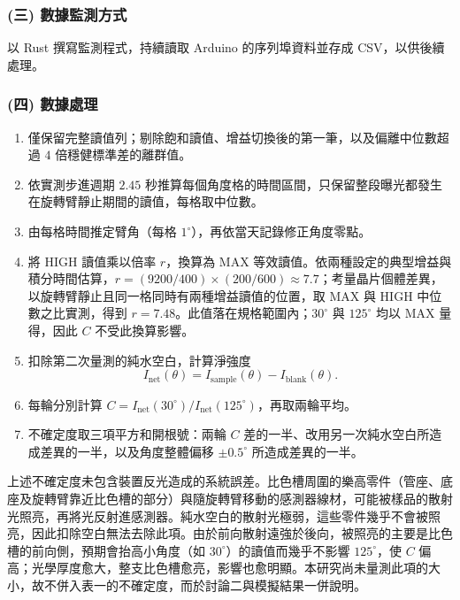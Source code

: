 \subsubsection*{(三) 數據監測方式}
以 Rust 撰寫監測程式，持續讀取 Arduino 的序列埠資料並存成 CSV，以供後續處理。

\subsubsection*{(四) 數據處理}
\begin{enumerate}
    \item 僅保留完整讀值列；剔除飽和讀值、增益切換後的第一筆，以及偏離中位數超過 $4$ 倍穩健標準差的離群值。
    \item 依實測步進週期 $2.45$ 秒推算每個角度格的時間區間，只保留整段曝光都發生在旋轉臂靜止期間的讀值，每格取中位數。
    \item 由每格時間推定臂角（每格 $1^\circ$），再依當天記錄修正角度零點。
    \item 將 HIGH 讀值乘以倍率 $r$，換算為 MAX 等效讀值。依兩種設定的典型增益與積分時間估算，$r=(9200/400)\times(200/600)\approx7.7$；考量晶片個體差異，以旋轉臂靜止且同一格同時有兩種增益讀值的位置，取 MAX 與 HIGH 中位數之比實測，得到 $r=7.48$。此值落在規格範圍內；$30^\circ$ 與 $125^\circ$ 均以 MAX 量得，因此 $C$ 不受此換算影響。
    \item 扣除第二次量測的純水空白，計算淨強度
    \[
        I_{\mathrm{net}}(\theta)=I_{\mathrm{sample}}(\theta)-I_{\mathrm{blank}}(\theta).
    \]
    \item 每輪分別計算 $C=I_{\mathrm{net}}(30^\circ)/I_{\mathrm{net}}(125^\circ)$，再取兩輪平均。
    \item 不確定度取三項平方和開根號：兩輪 $C$ 差的一半、改用另一次純水空白所造成差異的一半，以及角度整體偏移 $\pm0.5^\circ$ 所造成差異的一半。
\end{enumerate}

上述不確定度未包含裝置反光造成的系統誤差。比色槽周圍的樂高零件（管座、底座及旋轉臂靠近比色槽的部分）與隨旋轉臂移動的感測器線材，可能被樣品的散射光照亮，再將光反射進感測器。純水空白的散射光極弱，這些零件幾乎不會被照亮，因此扣除空白無法去除此項。由於前向散射遠強於後向，被照亮的主要是比色槽的前向側，預期會抬高小角度（如 $30^\circ$）的讀值而幾乎不影響 $125^\circ$，使 $C$ 偏高；光學厚度愈大，整支比色槽愈亮，影響也愈明顯。本研究尚未量測此項的大小，故不併入表一的不確定度，而於討論二與模擬結果一併說明。
